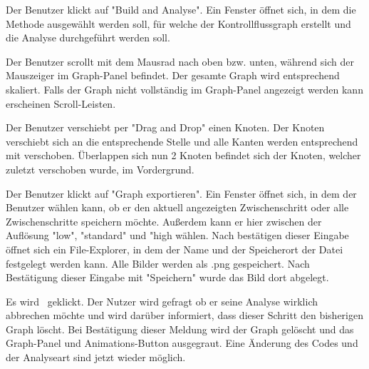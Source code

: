 {Der Benutzer klickt auf "Build and Analyse".}
{Ein Fenster öffnet sich, in dem die Methode ausgewählt werden soll, für welche der Kontrollflussgraph erstellt und die Analyse durchgeführt werden soll.}


\tests{}

{Der Benutzer scrollt mit dem Mausrad nach oben bzw. unten, während sich der Mauszeiger im Graph-Panel befindet.}
{Der gesamte Graph wird entsprechend skaliert. Falls der Graph nicht vollständig im Graph-Panel angezeigt werden kann erscheinen Scroll-Leisten.}

{Der Benutzer verschiebt per "Drag and Drop" einen Knoten.}
{Der Knoten verschiebt sich an die entsprechende Stelle und alle Kanten werden entsprechend mit verschoben. Überlappen sich nun 2 Knoten befindet sich der Knoten, welcher zuletzt verschoben wurde, im Vordergrund.}

\tests{}

{Der Benutzer klickt auf "Graph exportieren".}
{Ein Fenster öffnet sich, in dem der Benutzer wählen kann, ob er den aktuell angezeigten Zwischenschritt oder alle Zwischenschritte speichern möchte. Außerdem kann er hier zwischen der Auflösung "low", "standard" und "high wählen. Nach bestätigen dieser Eingabe öffnet sich ein File-Explorer, in dem der Name und der Speicherort der Datei festgelegt werden kann. Alle Bilder werden als .png gespeichert. Nach Bestätigung dieser Eingabe mit "Speichern" wurde das Bild dort abgelegt.}

\tests{}

\tests{}


{Es wird \faStop\ geklickt.}
{Der Nutzer wird gefragt ob er seine Analyse wirklich abbrechen möchte und wird darüber informiert, dass dieser Schritt den bisherigen Graph löscht. Bei Bestätigung dieser Meldung wird der Graph gelöscht und das Graph-Panel und Animations-Button ausgegraut. Eine Änderung des Codes und der Analyseart sind jetzt wieder möglich.}


